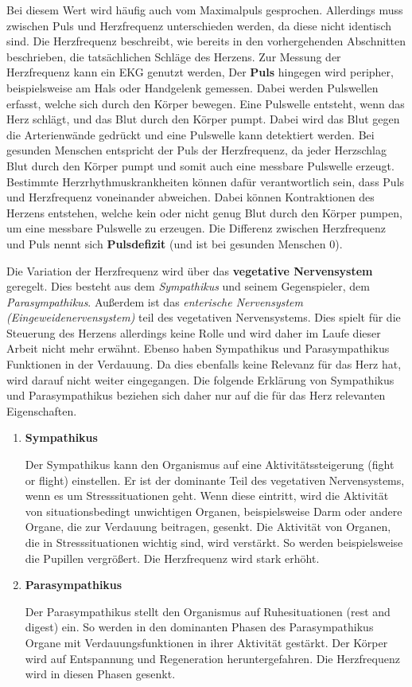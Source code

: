 Bei diesem Wert wird häufig auch vom Maximalpuls gesprochen. Allerdings muss zwischen Puls und Herzfrequenz unterschieden werden, da diese nicht identisch sind. 
Die Herzfrequenz beschreibt, wie bereits in den vorhergehenden Abschnitten beschrieben, die tatsächlichen Schläge des Herzens. Zur Messung der Herzfrequenz kann ein EKG genutzt werden,
Der \textbf{Puls} hingegen wird peripher, beispielsweise am Hals oder Handgelenk gemessen. Dabei werden Pulswellen erfasst, welche sich durch den Körper bewegen. Eine Pulswelle entsteht, wenn das Herz schlägt, und das Blut durch den Körper pumpt. Dabei wird das Blut gegen die Arterienwände gedrückt und eine Pulswelle kann detektiert werden.
Bei gesunden Menschen entspricht der Puls der Herzfrequenz, da jeder Herzschlag Blut durch den Körper pumpt und somit auch eine messbare Pulswelle erzeugt. Bestimmte Herzrhythmuskrankheiten können dafür verantwortlich sein, dass Puls und Herzfrequenz voneinander abweichen. Dabei können Kontraktionen des Herzens entstehen, welche kein oder nicht genug Blut durch den Körper pumpen, um eine messbare Pulswelle zu erzeugen. Die Differenz zwischen Herzfrequenz und Puls nennt sich \textbf{Pulsdefizit} (und ist bei gesunden Menschen 0). \cite{babilon}

Die Variation der Herzfrequenz wird über das \textbf{vegetative Nervensystem} geregelt. Dies besteht aus dem \textit{Sympathikus} und seinem Gegenspieler, dem \textit{Parasympathikus}. Außerdem ist das \textit{enterische Nervensystem (Eingeweidenervensystem)} teil des vegetativen Nervensystems. Dies spielt für die Steuerung des Herzens allerdings keine Rolle und wird daher im Laufe dieser Arbeit nicht mehr erwähnt. Ebenso haben Sympathikus und Parasympathikus Funktionen in der Verdauung. Da dies ebenfalls keine Relevanz für das Herz hat, wird darauf nicht weiter eingegangen. Die folgende Erklärung von Sympathikus und Parasympathikus beziehen sich daher nur auf die für das Herz relevanten Eigenschaften.\cite{veg}

\begin{enumerate}
	\item \textbf{Sympathikus} 
	
	Der Sympathikus kann den Organismus auf eine Aktivitätssteigerung (\glqq fight or flight\grqq{}) einstellen. Er ist der dominante Teil des vegetativen Nervensystems, wenn es um Stresssituationen geht. Wenn diese eintritt, wird die Aktivität von situationsbedingt unwichtigen Organen, beispielsweise Darm oder andere Organe, die zur Verdauung beitragen, gesenkt. 
	Die Aktivität von Organen, die in Stresssituationen wichtig sind, wird verstärkt. So werden beispielsweise die Pupillen vergrößert.
Die Herzfrequenz wird stark erhöht.\cite{sym}	
	
	\item \textbf{Parasympathikus}
	
	Der Parasympathikus stellt den Organismus auf Ruhesituationen (\glqq rest and digest\grqq{}) ein. So werden in den dominanten Phasen des Parasympathikus Organe mit Verdauungsfunktionen in ihrer Aktivität gestärkt. Der Körper wird auf Entspannung und Regeneration heruntergefahren. 
	Die Herzfrequenz wird in diesen Phasen gesenkt.\cite{para}
\end{enumerate}

